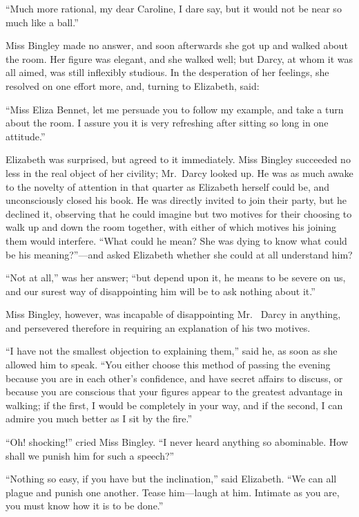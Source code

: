 ``Much more rational, my dear Caroline, I dare say, but it would
not be near so much like a ball.''

Miss Bingley made no answer, and soon afterwards she got up
and walked about the room.  Her figure was elegant, and she
walked well; but Darcy, at whom it was all aimed, was still
inflexibly studious.  In the desperation of her feelings, she
resolved on one effort more, and, turning to Elizabeth, said:

``Miss Eliza Bennet, let me persuade you to follow my example,
and take a turn about the room.  I assure you it is very
refreshing after sitting so long in one attitude.''

Elizabeth was surprised, but agreed to it immediately.  Miss
Bingley succeeded no less in the real object of her civility;
Mr.\ Darcy looked up.  He was as much awake to the novelty of
attention in that quarter as Elizabeth herself could be, and
unconsciously closed his book.  He was directly invited to join
their party, but he declined it, observing that he could imagine
but two motives for their choosing to walk up and down the
room together, with either of which motives his joining them
would interfere.  ``What could he mean?  She was dying to know
what could be his meaning?''---and asked Elizabeth whether she
could at all understand him?

``Not at all,'' was her answer; ``but depend upon it, he means to
be severe on us, and our surest way of disappointing him will be
to ask nothing about it.''

Miss Bingley, however, was incapable of disappointing Mr.\ %
Darcy in anything, and persevered therefore in requiring an
explanation of his two motives.

``I have not the smallest objection to explaining them,'' said he,
as soon as she allowed him to speak.  ``You either choose this
method of passing the evening because you are in each other's
confidence, and have secret affairs to discuss, or because you are
conscious that your figures appear to the greatest advantage in
walking; if the first, I would be completely in your way, and if
the second, I can admire you much better as I sit by the fire.''

``Oh! shocking!'' cried Miss Bingley.  ``I never heard anything so
abominable.  How shall we punish him for such a speech?''

``Nothing so easy, if you have but the inclination,'' said Elizabeth.
``We can all plague and punish one another.  Tease him---laugh
at him.  Intimate as you are, you must know how it is to be
done.''

